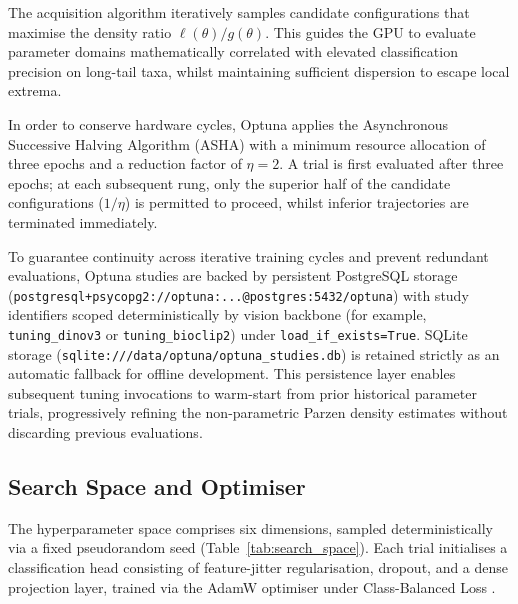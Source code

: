 The acquisition algorithm iteratively samples candidate configurations that maximise the density ratio $\ell(\theta) / g(\theta)$. This guides the GPU to evaluate parameter domains mathematically correlated with elevated classification precision on long-tail taxa, whilst maintaining sufficient dispersion to escape local extrema.

In order to conserve hardware cycles, Optuna applies the Asynchronous Successive Halving Algorithm (ASHA) with a minimum resource allocation of three epochs and a reduction factor of $\eta = 2$. A trial is first evaluated after three epochs; at each subsequent rung, only the superior half of the candidate configurations ($1/\eta$) is permitted to proceed, whilst inferior trajectories are terminated immediately.

To guarantee continuity across iterative training cycles and prevent redundant evaluations, Optuna studies are backed by persistent PostgreSQL storage (\nolinkurl{postgresql+psycopg2://optuna:...@postgres:5432/optuna}) with study identifiers scoped deterministically by vision backbone (for example, \texttt{tuning\_dinov3} or \texttt{tuning\_bioclip2}) under \texttt{load\_if\_exists=True}. SQLite storage (\nolinkurl{sqlite:///data/optuna/optuna_studies.db}) is retained strictly as an automatic fallback for offline development. This persistence layer enables subsequent tuning invocations to warm-start from prior historical parameter trials, progressively refining the non-parametric Parzen density estimates without discarding previous evaluations.

\subsection{Search Space and Optimiser}
\label{sec:search_space}

The hyperparameter space comprises six dimensions, sampled deterministically via a fixed pseudorandom seed (Table~\ref{tab:search_space}). Each trial initialises a classification head consisting of feature-jitter regularisation, dropout, and a dense projection layer, trained via the AdamW optimiser under Class-Balanced Loss \cite{cui2019classbalanced}.

